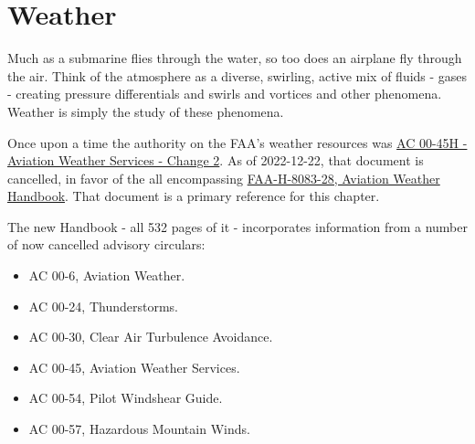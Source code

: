 \chapter{Weather}

Much as a submarine flies through the water, so too does an airplane fly through the air. Think of the atmosphere as a diverse, swirling, active mix of fluids - gases - creating pressure differentials and swirls and vortices and other phenomena. Weather is simply the study of these phenomena.

Once upon a time the authority on the FAA's weather resources was \href{https://www.faa.gov/regulations_policies/advisory_circulars/index.cfm/go/document.information/documentID/1030235}{AC 00-45H - Aviation Weather Services - Change 2}. As of 2022-12-22, that document is cancelled, in favor of the all encompassing \href{https://www.faa.gov/regulationspolicies/handbooksmanuals/aviation/faa-h-8083-28-aviation-weather-handbook}{FAA-H-8083-28, Aviation Weather Handbook}. That document is a primary reference for this chapter.

The new Handbook - all 532 pages of it - incorporates information from a number of now cancelled advisory circulars:

\begin{itemize}
\item AC 00-6, Aviation Weather.
\item AC 00-24, Thunderstorms.
\item AC 00-30, Clear Air Turbulence Avoidance.
\item AC 00-45, Aviation Weather Services.
\item AC 00-54, Pilot Windshear Guide.
\item AC 00-57, Hazardous Mountain Winds.
\end{itemize}



